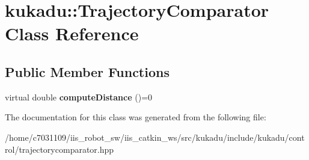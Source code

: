 \hypertarget{classkukadu_1_1TrajectoryComparator}{\section{kukadu\-:\-:Trajectory\-Comparator Class Reference}
\label{classkukadu_1_1TrajectoryComparator}
}
\subsection*{Public Member Functions}
\begin{DoxyCompactItemize}
\item 
\hypertarget{classkukadu_1_1TrajectoryComparator_ac884f270abd402a6a121de51847424fa}{virtual double {\bfseries compute\-Distance} ()=0}\label{classkukadu_1_1TrajectoryComparator_ac884f270abd402a6a121de51847424fa}

\end{DoxyCompactItemize}


The documentation for this class was generated from the following file\-:\begin{DoxyCompactItemize}
\item 
/home/c7031109/iis\-\_\-robot\-\_\-sw/iis\-\_\-catkin\-\_\-ws/src/kukadu/include/kukadu/control/trajectorycomparator.\-hpp\end{DoxyCompactItemize}
